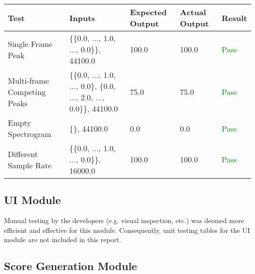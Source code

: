 \documentclass[12pt, titlepage]{article}
\begin{document}
\begin{longtable}{|L{3cm}|L{2cm}|L{2cm}|L{2cm}|l|}
  \hline
  \textbf{Test} & \textbf{Inputs} & \textbf{Expected Output} & \textbf{Actual Output} & \textbf{Result} \\
  \hline
  Single Frame Peak & \{\{0.0, ..., 1.0, ..., 0.0\}\}, 44100.0 & 100.0 & 100.0 & \textcolor{green}{Pass} \\
  \hline
  Multi-frame Competing Peaks & \{\{0.0, ..., 1.0, ..., 0.0\}, \{0.0, ..., 2.0, ..., 0.0\}\}, 44100.0 & 75.0 & 75.0 & \textcolor{green}{Pass} \\
  \hline
  Empty Spectrogram & \{\}, 44100.0 & 0.0 & 0.0 & \textcolor{green}{Pass} \\
  \hline
  Different Sample Rate & \{\{0.0, ..., 1.0, ..., 0.0\}\}, 16000.0 & 100.0 & 100.0 & \textcolor{green}{Pass} \\
  \hline
\end{longtable}

\subsection{UI Module}
Manual testing by the developers (e.g. visual inspection, etc.) was deemed more efficient and effective for this module. Consequently, unit testing tables for the UI 
module are not included in this report.\\

\subsection{Score Generation Module}
\end{document}
